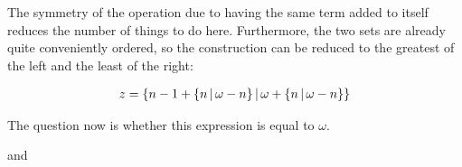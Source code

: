 The symmetry of the operation due to having the same term added to itself reduces the number of things to do here.  Furthermore, the two sets are already quite conveniently ordered, so the construction can be reduced to the greatest of the left and the least of the right:

\begin{align*}
    z = \left\{n - 1 + \left\{n \,\middle|\, \omega - n\right\} \,\middle|\, \omega + \left\{n \,\middle|\, \omega - n\right\}\right\}
\end{align*}

The question now is whether this expression is equal to $\omega$.


and

